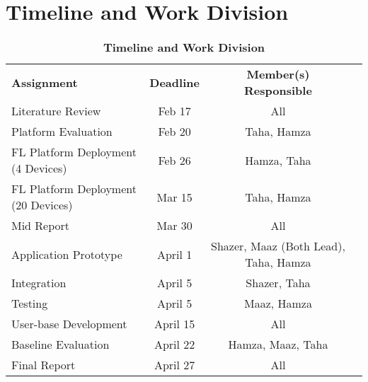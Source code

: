 \section{Timeline and Work Division}
\begin{table}
    \footnotesize
    \centering
    \begin{tabular}{lccc}
        \textbf{Assignment} & \textbf{Deadline}  & \textbf{Member(s) Responsible}\\
        
        Literature Review                       & Feb 17          & All                     \\
        Platform Evaluation                     & Feb 20          & Taha, Hamza            \\
        FL Platform Deployment (4 Devices)      & Feb 26          & Hamza, Taha             \\
        FL Platform Deployment (20 Devices)     & Mar 15          & Taha, Hamza             \\
        Mid Report                              & Mar 30          & All                     \\
        Application Prototype                   & April 1         & Shazer, Maaz (Both Lead), Taha, Hamza            \\
        Integration                             & April 5         & Shazer, Taha        \\
        Testing                                 & April 5         & Maaz, Hamza         \\
        User-base Development                   & April 15        & All                 \\
        Baseline Evaluation                     & April 22        & Hamza, Maaz, Taha   \\
        Final Report                            & April 27        & All \\
    \end{tabular}

    \caption{
        {\bf Timeline and Work Division}
    }
\end{table}